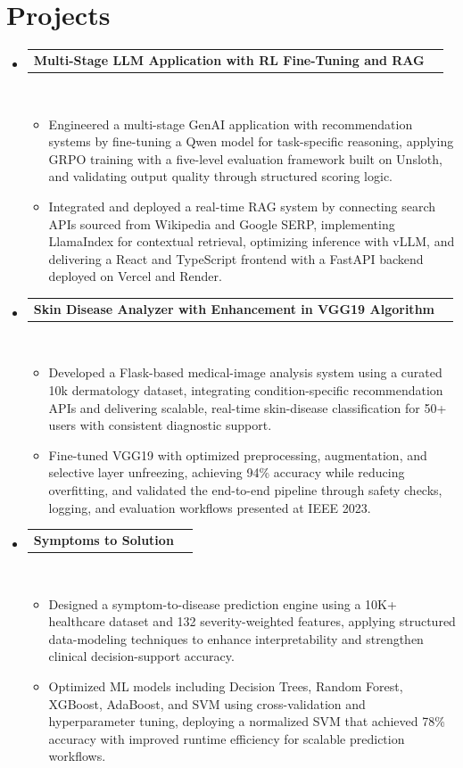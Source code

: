 \documentclass[letterpaper,11pt]{article}
\newcommand{\resumeItem}[1]{\item\small{{#1 \vspace{-3pt}}}}
\newcommand{\resumeProjectHeading}[2]{
    \vspace{-3pt}\item
    \begin{tabularx}{0.995\textwidth}[t]{Xr}
      \small\textbf{#1} & #2 \\
    \end{tabularx}\\[-3pt]
    \vspace{3pt}
}
\newcommand{\resumeItemListStart}{\begin{itemize}}
\newcommand{\resumeItemListEnd}{\end{itemize}\vspace{-4pt}}
\newcommand{\resumeSubHeadingListStart}{
  \begin{itemize}[leftmargin=0.12in, label={}]
  \setlength{\itemsep}{0pt}
  \setlength{\parsep}{0pt}
  \setlength{\parskip}{0pt}
}
\newcommand{\resumeSubHeadingListEnd}{\end{itemize}}
\begin{document}
\section{Projects}
\vspace{-4pt}
\resumeSubHeadingListStart
\resumeProjectHeading
{Multi-Stage LLM Application with RL Fine-Tuning and RAG}{}
\resumeItemListStart
\resumeItem{Engineered a multi-stage GenAI application with recommendation systems by fine-tuning a Qwen model for task-specific reasoning, applying GRPO training with a five-level evaluation framework built on Unsloth, and validating output quality through structured scoring logic.}
\resumeItem{Integrated and deployed a real-time RAG system by connecting search APIs sourced from Wikipedia and Google SERP, implementing LlamaIndex for contextual retrieval, optimizing inference with vLLM, and delivering a React and TypeScript frontend with a FastAPI backend deployed on Vercel and Render.}
\resumeItemListEnd

\resumeProjectHeading
{Skin Disease Analyzer with Enhancement in VGG19 Algorithm}{}
\resumeItemListStart
\resumeItem{Developed a Flask-based medical-image analysis system using a curated 10k dermatology dataset, integrating condition-specific recommendation APIs and delivering scalable, real-time skin-disease classification for 50+ users with consistent diagnostic support.}
\resumeItem{Fine-tuned VGG19 with optimized preprocessing, augmentation, and selective layer unfreezing, achieving 94\% accuracy while reducing overfitting, and validated the end-to-end pipeline through safety checks, logging, and evaluation workflows presented at IEEE 2023.}
\resumeItemListEnd

\resumeProjectHeading
{Symptoms to Solution}{}
\resumeItemListStart
\resumeItem{Designed a symptom-to-disease prediction engine using a 10K+ healthcare dataset and 132 severity-weighted features, applying structured data-modeling techniques to enhance interpretability and strengthen clinical decision-support accuracy.}
\resumeItem{Optimized ML models including Decision Trees, Random Forest, XGBoost, AdaBoost, and SVM using cross-validation and hyperparameter tuning, deploying a normalized SVM that achieved 78\% accuracy with improved runtime efficiency for scalable prediction workflows.}
\resumeItemListEnd
\resumeSubHeadingListEnd
\end{document}
